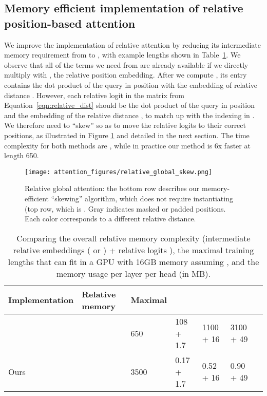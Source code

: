 \documentclass{article} \usepackage{iclr2019_conference,times}
\begin{document}
\subsection{Memory efficient implementation of relative position-based attention}
\label{fast}
We improve the implementation of relative attention by reducing its intermediate memory requirement from  to , with example lengths shown in Table~\ref{table:complexity}.  We observe that all of the terms we need from  are already available if we directly multiply  with , the relative position embedding.
After we compute , its  entry contains the dot product of the query in position  with the embedding of relative distance . However, each relative logit  in the matrix  from Equation~\ref{eqn:relative_dist} should be the dot product of the query in position  and the embedding of the relative distance , to match up with the indexing in .  We therefore need to ``skew''  so as to move the relative logits to their correct positions, as illustrated in Figure \ref{fig:global_skew} and detailed in the next section. 
The time complexity for both methods are ,
while in practice our method is 6x faster at length 650.


\begin{figure}[H]
\vskip -0.05in
\begin{center}
\centerline{\texttt{[image: attention\_figures/relative\_global\_skew.png]}}
\caption{Relative global attention: the bottom row describes our memory-efficient ``skewing'' algorithm, which does not require instantiating  (top row, which is .  Gray indicates masked or padded positions. Each color corresponds to a different relative distance.}
\label{fig:global_skew}
\end{center}
\vskip -0.2in
\end{figure}

\begin{table}[h]
  \caption{Comparing the overall relative memory complexity (intermediate relative embeddings ( or ) + relative logits ), the maximal training lengths that can fit in a GPU with 16GB memory assuming , and the memory usage per layer per head (in MB).}
  \label{table:complexity}
  \centering
  \begin{tabular}{lllllll}
    \toprule
    Implementation      & Relative memory  & Maximal  &   &  &  \\
    \midrule
    \cite{shaw2018self} &  & 650   & 108 + 1.7  & 1100 + 16 &  3100 + 49 \\
    Ours &                   & 3500  & 0.17 + 1.7   & 0.52 + 16 & 0.90 + 49 \\
\bottomrule
  \end{tabular}
\end{table}
\end{document}
